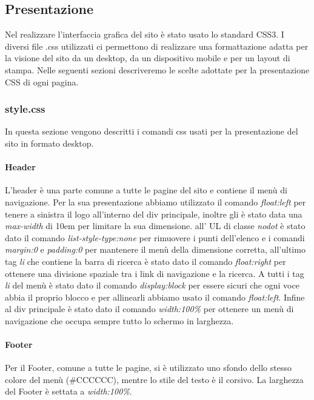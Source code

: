 \subsection{Presentazione}
Nel realizzare l'interfaccia grafica del sito è stato usato lo standard CSS3.\newline
I diversi file .css utilizzati ci permettono di realizzare una formattazione adatta per la visione del sito da un desktop, da un dispositivo mobile e per un layout di stampa. \newline 
Nelle seguenti sezioni descriveremo le scelte adottate per la presentazione CSS di ogni pagina.

\subsubsection{style.css}
In questa sezione vengono descritti i comandi css usati per la presentazione del sito in formato desktop.

\paragraph{Header} \Spazio
L'header è una parte comune a tutte le pagine del sito e contiene il menù di navigazione. \newline Per la sua presentazione abbiamo utilizzato il comando \emph{float:left} per tenere a sinistra il logo all'interno del div principale, inoltre gli è stato data una \emph{max-width} di 10em per limitare la sua dimensione. all' UL di classe \emph{nodot} è stato dato il comando \emph{list-style-type:none} per rimuovere i punti dell'elenco e i comandi \emph{margin:0} e \emph{padding:0} per mantenere il menù della dimensione corretta, all'ultimo tag \emph{li} che contiene la barra di ricerca è stato dato il comando \emph{float:right} per ottenere una divisione spaziale tra i link di navigazione e la ricerca.
A tutti i tag \emph{li} del menù è stato dato il comando \emph{display:block} per essere sicuri che ogni voce abbia il proprio blocco e per allinearli abbiamo usato il comando \emph{float:left}.
Infine al div principale è stato dato il comando \emph{width:100\%} per ottenere un menù di navigazione che occupa sempre tutto lo schermo in larghezza.

\paragraph{Footer} \Spazio
Per il Footer, comune a tutte le pagine, si è utilizzato uno sfondo dello stesso colore del menù (#CCCCCC), mentre lo stile del testo è il corsivo. La larghezza del Footer è settata a \emph{width:100\%}.


